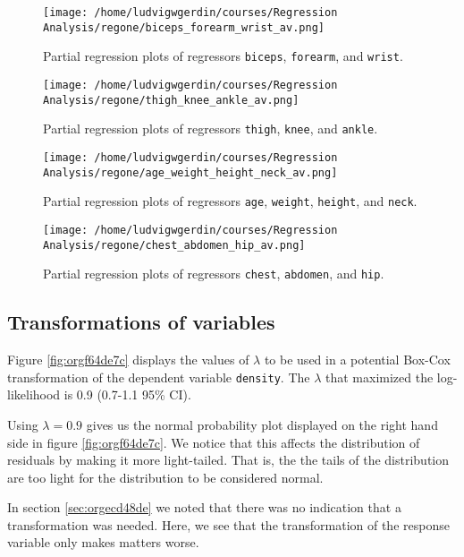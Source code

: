 \documentclass[11pt]{article}
\begin{document}
\begin{figure}[htbp]
\centering
\texttt{[image: /home/ludvigwgerdin/courses/Regression Analysis/regone/biceps\_forearm\_wrist\_av.png]}
\caption{\label{fig:org4c6797e}
Partial regression plots of regressors \texttt{biceps}, \texttt{forearm}, and \texttt{wrist}.}
\end{figure}   

\begin{figure}[htbp]
\centering
\texttt{[image: /home/ludvigwgerdin/courses/Regression Analysis/regone/thigh\_knee\_ankle\_av.png]}
\caption{\label{fig:orgd456e0f}
Partial regression plots of regressors \texttt{thigh}, \texttt{knee}, and \texttt{ankle}.}
\end{figure}

\begin{figure}[htbp]
\centering
\texttt{[image: /home/ludvigwgerdin/courses/Regression Analysis/regone/age\_weight\_height\_neck\_av.png]}
\caption{\label{fig:org323ed7b}
Partial regression plots of regressors \texttt{age}, \texttt{weight}, \texttt{height}, and \texttt{neck}.}
\end{figure}

\begin{figure}[htbp]
\centering
\texttt{[image: /home/ludvigwgerdin/courses/Regression Analysis/regone/chest\_abdomen\_hip\_av.png]}
\caption{\label{fig:org194bcd2}
Partial regression plots of regressors \texttt{chest}, \texttt{abdomen}, and \texttt{hip}.}
\end{figure}
\subsection{Transformations of variables}
\label{sec:org8650d06}

Figure \ref{fig:orgf64de7c} displays the values of \(\lambda\) to be used in a potential Box-Cox transformation of 
the dependent variable \texttt{density}. The \(\lambda\) that maximized the log-likelihood is 0.9 (0.7-1.1 95\% CI). 

Using \(\lambda = 0.9\) gives us the normal probability plot displayed on the right hand side in figure \ref{fig:orgf64de7c}.
We notice that this affects the distribution of residuals by making it more light-tailed. That is, the 
the tails of the distribution are too light for the distribution to be considered normal.

In section \ref{sec:orgecd48de} we noted that there was no indication that a transformation was needed. 
Here, we see that the transformation of the response variable only makes matters worse.
\end{document}
